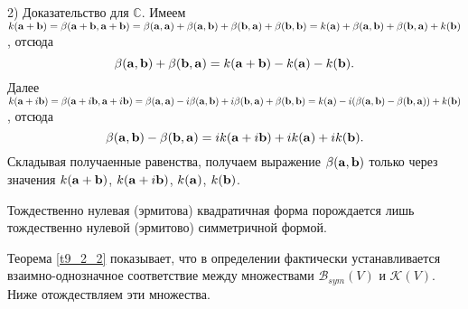 2) Доказательство для $\mathbb{C}$. 
Имеем \\
$k(\mathbf{a}+\mathbf{b}) = \beta (\mathbf{a}+\mathbf{b}, \mathbf{a}+\mathbf{b}) = \beta (\mathbf{a}, \mathbf{a}) + \beta (\mathbf{a}, \mathbf{b}) + \beta (\mathbf{b}, \mathbf{a})+\beta (\mathbf{b}, \mathbf{b}) 
= k (\mathbf{a}) + \beta (\mathbf{a}, \mathbf{b})+\beta (\mathbf{b}, \mathbf{a})+k (\mathbf{b})$, 
отсюда $$\beta (\mathbf{a}, \mathbf{b})+\beta (\mathbf{b}, \mathbf{a}) = k(\mathbf{a}+\mathbf{b})-k (\mathbf{a})-k (\mathbf{b}).$$
Далее \\
$k(\mathbf{a}+i\mathbf{b}) = \beta (\mathbf{a}+i\mathbf{b}, \mathbf{a}+i\mathbf{b}) = \beta (\mathbf{a}, \mathbf{a}) -i \beta (\mathbf{a}, \mathbf{b}) + i \beta (\mathbf{b}, \mathbf{a})+\beta (\mathbf{b}, \mathbf{b}) 
= k (\mathbf{a}) -i (\beta (\mathbf{a}, \mathbf{b})-\beta (\mathbf{b}, \mathbf{a}))+k (\mathbf{b})$, 
отсюда $$\beta (\mathbf{a}, \mathbf{b})-\beta (\mathbf{b}, \mathbf{a}) = ik(\mathbf{a}+i\mathbf{b})+ik (\mathbf{a})+ik (\mathbf{b}).$$
Складывая получаенные равенства, получаем выражение $\beta (\mathbf{a}, \mathbf{b})$ только через значения 
$k(\mathbf{a}+\mathbf{b})$, $k(\mathbf{a}+i\mathbf{b})$, $k(\mathbf{a})$, $k(\mathbf{b})$.
\edok

\begin{sled}
Тождественно нулевая (эрмитова) квадратичная форма порождается лишь тождественно нулевой (эрмитово) симметричной формой.
\end{sled}

\otstup

Теорема \ref{t9_2_2} показывает, что в определении фактически устанавливается взаимно-однозначное соответствие между множествами $\mathcal{B}_{sym}(V)$ и $\mathcal{K}(V)$. 
Ниже отождествляем эти множества.





